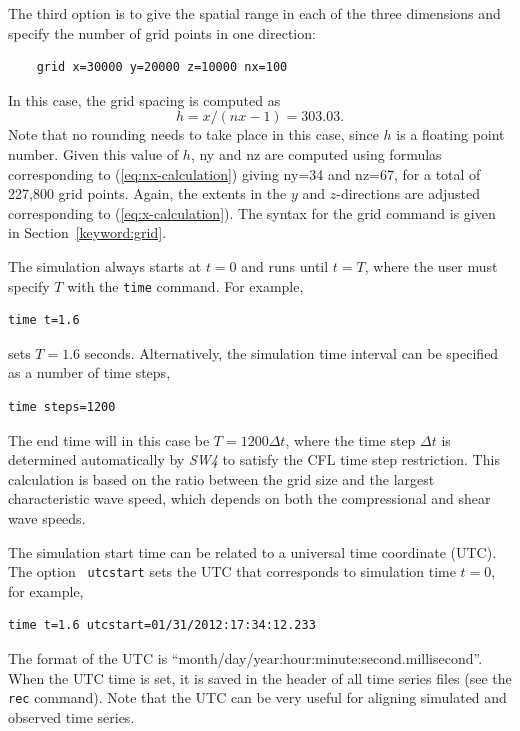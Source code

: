 \documentclass[11pt]{report}
\begin{document}
The third option is to give the spatial range in each of the three dimensions and specify the number
of grid points in one direction:
%
\begin{verbatim}
	grid x=30000 y=20000 z=10000 nx=100
\end{verbatim}
%
In this case, the grid spacing is computed as 
\[
h = x/(nx-1)= 303.03.
\]
Note that no rounding needs to take place in this case, since $h$ is a floating point number. Given this
value of $h$, ny and nz are computed using formulas corresponding to
(\ref{eq:nx-calculation}) giving ny=34 and nz=67, for a total of 227,800 grid points. Again,
the extents in the $y$ and $z$-directions are adjusted corresponding to (\ref{eq:x-calculation}). The syntax
for the grid command is given in Section~\ref{keyword:grid}.

The simulation always starts at $t=0$ and runs until $t=T$, where the user must specify $T$ with the
{\tt time} command. For example,
\begin{verbatim}
time t=1.6
\end{verbatim}
sets $T=1.6$ seconds. Alternatively, the simulation time interval can be specified as 
a number of time steps,
\begin{verbatim}
time steps=1200
\end{verbatim}
The end time will in this case be $T=1200\Delta t$,
where the time step $\Delta t$ is determined automatically by \emph{SW4} to satisfy the CFL time
step restriction. This calculation is based on the ratio between the grid size and the largest
characteristic wave speed, which depends on both the compressional and shear wave speeds. 

The simulation start time can be related to a universal time coordinate (UTC). The option {\tt
  utcstart} sets the UTC that corresponds to simulation time $t=0$, for example,
\begin{verbatim}
time t=1.6 utcstart=01/31/2012:17:34:12.233
\end{verbatim}
The format of the UTC is ``month/day/year:hour:minute:second.millisecond''. When the UTC time
is set, it is saved in the header of all time series files (see the {\tt rec} command). Note that
the UTC can be very useful for aligning simulated and observed time series.
\end{document}
